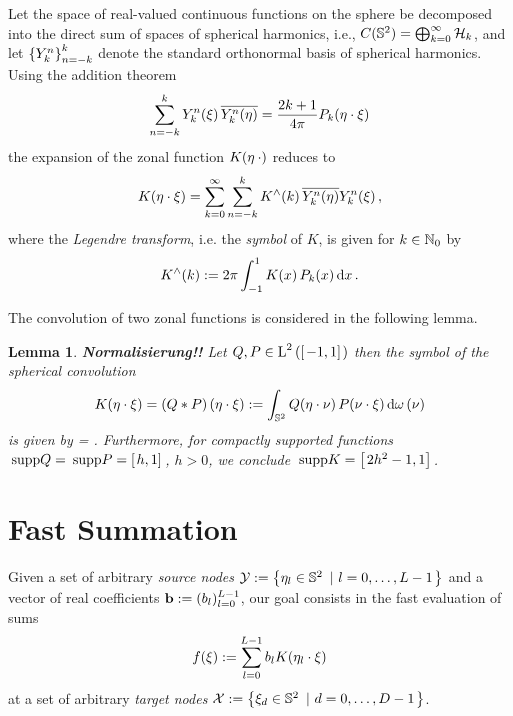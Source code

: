\documentclass[11pt,a4paper,twoside,bibtotoc]{scrartcl}
\theoremstyle{plain}
\newtheorem{lemma}[theorem]{Lemma}
\theoremstyle{definition}
\theoremstyle{remark}
\newcommand{\supp}{\:{\rm supp}}
\numberwithin{equation}{section}
\numberwithin{table}{section}
\numberwithin{figure}{section}
\begin{document}
Let the space of real-valued continuous functions on the sphere be decomposed
into the direct sum of spaces of spherical harmonics, i.e.,
$C(\mathbb{S}^2)=\bigoplus_{k=0}^{\infty} \mathcal{H}_k$, and let
$\left\{Y_{k}^n\right\rbrace_{n=-k}^{k}$ denote the standard orthonormal basis of spherical
harmonics.
Using the addition theorem
\[
\sum_{n=-k}^{k} Y_{k}^n{\hspace{-0.4ex}}\left(\mathbf{\xi}\right) \overline{Y_{k}^n{\hspace{-0.4ex}}\left(\mathbf{\eta}\right)} =
    \frac{2k+1}{4\pi}P_k{\hspace{-0.4ex}}\left(\mathbf{\eta} \cdot \mathbf{\xi}\right)
\]
the expansion of the zonal function $K{\hspace{-0.4ex}}\left(\mathbf{\eta} \: \cdot\right)$ reduces to
\begin{equation}
  \label{Basics:Kernel}
  K{\hspace{-0.4ex}}\left(\mathbf{\eta} \cdot \mathbf{\xi}\right) = \sum_{k = 0}^{\infty} \sum_{n=-k}^k
  K^{\wedge}{\hspace{-0.4ex}}\left(k\right)\overline{Y_{k}^n{\hspace{-0.4ex}}\left(\mathbf{\eta}\right)} Y_{k}^n{\hspace{-0.4ex}}\left(\mathbf{\xi}\right),
\end{equation}
where the \emph{Legendre transform}, i.e. the \emph{symbol} of $K$, is given
for $k \in \mathbb{N}_{0}$ by
\[
  K^{\wedge}{\hspace{-0.4ex}}\left(k\right) := 2 \pi \int_{-1}^{1} K{\hspace{-0.4ex}}\left(x\right) P_{k}{\hspace{-0.4ex}}\left(x\right) \text{\rm{d}} x\,.
\]

The convolution of two zonal functions is considered in the following lemma.
\begin{lemma} {\bf Normalisierung!!}
  Let $Q,P\in \text{\rm{L}}^{2}\left(\left[\left.-1,1\right]\right.\right)$ then the symbol of the spherical
  convolution
  \[
  K{\hspace{-0.4ex}}\left(\mathbf{\eta} \cdot \mathbf{\xi}\right) = \left(Q * P\right){\hspace{-0.4ex}}\left(\mathbf{\eta} \cdot
    \mathbf{\xi}\right) := \int_{\mathbb{S}^2} Q{\hspace{-0.4ex}}\left(\mathbf{\eta} \cdot \mathbf{\nu}\right)
  P{\hspace{-0.4ex}}\left(\mathbf{\nu} \cdot \mathbf{\xi}\right) \text{\rm{d}} \omega\left(\nu\right)
  \]
  is given by
   =  .
  Furthermore, for compactly supported functions $\supp Q = \supp P =
  \interv{[}{h}{1}{]}$, $h>0$, we conclude $\supp K =
  \interv{[}{2h^2-1}{1}{]}$.
\end{lemma}

\section{Fast Summation}
Given a set of arbitrary \emph{source nodes} $\mathcal{Y} :=
  \left\{\mathbf{\eta}_{l} \in \mathbb{S}^2\ \left|\ l = 0,\ldots,L-1\right.\right\rbrace$ and a vector of
  real coefficients $\mathbf{b}:=(b_{l})_{l=0}^{L-1}$, our goal consists in the fast
evaluation of sums 
\begin{equation}
  \label{Applications:KernelSum}
  f{\hspace{-0.4ex}}\left(\xi\right) := \sum_{l = 0}^{L-1} b_{l} K{\hspace{-0.4ex}}\left(\mathbf{\eta}_{l} \cdot \mathbf{\xi}\right)
\end{equation}
at a set of arbitrary \emph{target nodes} $\mathcal{X} := \left\{\mathbf{\xi}_{d}
  \in \mathbb{S}^2\ \left|\ d=0,\ldots,D-1\right.\right\rbrace$.
\end{document}
